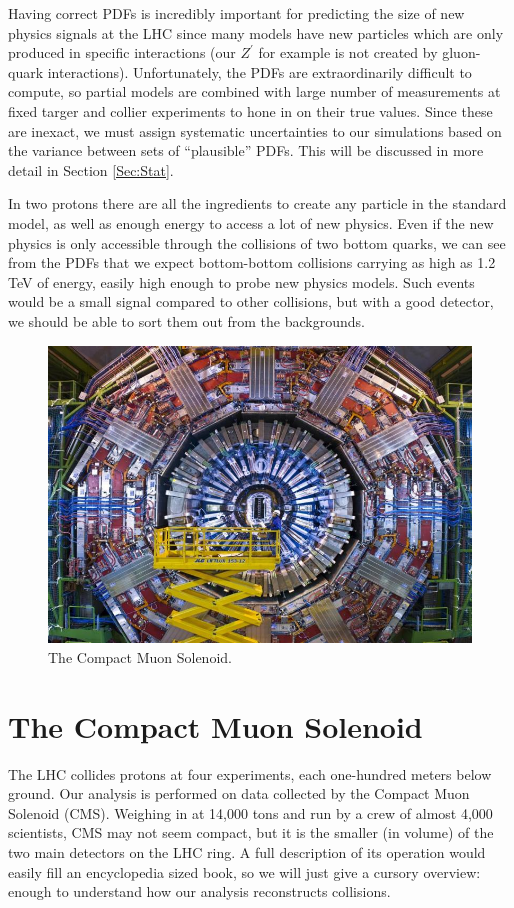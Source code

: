Having correct PDFs is incredibly important for predicting the size of new physics signals at the LHC since many models have new particles which are only produced in specific interactions (our $Z^\prime$ for example is not created by gluon-quark interactions). Unfortunately, the PDFs are extraordinarily difficult to compute, so partial models are combined with large number of measurements at fixed targer and collier experiments to hone in on their true values. Since these are inexact, we must assign systematic uncertainties to our simulations based on the variance between sets of ``plausible'' PDFs. This will be discussed in more detail in Section \ref{Sec:Stat}.

In two protons there are all the ingredients to create any particle in the standard model, as well as enough energy to access a lot of new physics. Even if the new physics is only accessible through the collisions of two bottom quarks, we can see from the PDFs that we expect bottom-bottom collisions carrying as high as 1.2 TeV of energy, easily high enough to probe new physics models. Such events would be a small signal compared to other collisions, but with a good detector, we should be able to sort them out from the backgrounds.
\begin{figure}[h!]
    \centering
        \includegraphics[width=\textwidth]{F3/cms_0}
        \caption{The Compact Muon Solenoid.}
        \label{Fig:CMS:cms}
\end{figure}

\section{The Compact Muon Solenoid}
The LHC collides protons at four experiments, each one-hundred meters below ground. Our analysis is performed on data collected by the Compact Muon Solenoid (CMS)\cite{Bayatian:922757}. Weighing in at 14,000 tons and run by a crew of almost 4,000 scientists, CMS may not seem compact, but it is the smaller (in volume) of the two main detectors on the LHC ring. A full description of its operation would easily fill an encyclopedia sized book, so we will just give a cursory overview: enough to understand how our analysis reconstructs collisions.

